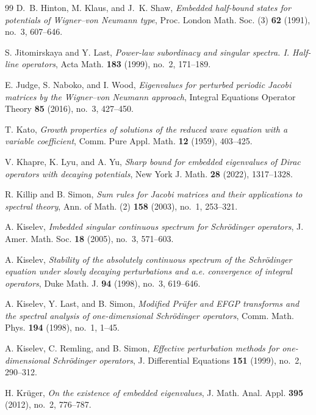 \documentclass[12pt]{amsart}
\theoremstyle{plain}
\theoremstyle{definition}
\begin{document}
\begin{thebibliography}{99}
	D.~B. Hinton, M. Klaus, and J.~K. Shaw,
	\emph{Embedded half-bound states for potentials of Wigner--von Neumann
		type},
	Proc. London Math. Soc. (3) \textbf{62} (1991), no.~3, 607--646.
	
	
	
	S. Jitomirskaya and Y. Last,
	\emph{Power-law subordinacy and singular spectra. I. Half-line
		operators},
	Acta Math. \textbf{183} (1999), no.~2, 171--189.
	
	
	E. Judge, S. Naboko, and I. Wood,
	\emph{Eigenvalues for perturbed periodic Jacobi matrices by the
		Wigner--von Neumann approach},
	Integral Equations Operator Theory \textbf{85} (2016), no.~3, 427--450.
	
	T. Kato,
	\emph{Growth properties of solutions of the reduced wave equation
		with a variable coefficient},
	Comm. Pure Appl. Math. \textbf{12} (1959), 403--425.
	
	V. Khapre, K. Lyu, and A. Yu,
	\emph{Sharp bound for embedded eigenvalues of Dirac operators with
		decaying potentials},
	New York J. Math. \textbf{28} (2022), 1317--1328.
	
	R. Killip and B. Simon,
	\emph{Sum rules for Jacobi matrices and their applications to spectral
		theory},
	Ann. of Math. (2) \textbf{158} (2003), no.~1, 253--321.
	
	A. Kiselev,
	\emph{Imbedded singular continuous spectrum for Schr\"odinger
		operators},
	J. Amer. Math. Soc. \textbf{18} (2005), no.~3, 571--603.
	
	A. Kiselev,
	\emph{Stability of the absolutely continuous spectrum of the
		Schr\"odinger equation under slowly decaying perturbations and a.e.
		convergence of integral operators},
	Duke Math. J. \textbf{94} (1998), no.~3, 619--646.
	
	A. Kiselev, Y. Last, and B. Simon,
	\emph{Modified Pr\"ufer and EFGP transforms and the spectral analysis
		of one-dimensional Schr\"odinger operators},
	Comm. Math. Phys. \textbf{194} (1998), no.~1, 1--45.
	
	A. Kiselev, C. Remling, and B. Simon,
	\emph{Effective perturbation methods for one-dimensional
		Schr\"odinger operators},
	J. Differential Equations \textbf{151} (1999), no.~2, 290--312.
	
	H. Kr\"uger,
	\emph{On the existence of embedded eigenvalues},
	J. Math. Anal. Appl. \textbf{395} (2012), no.~2, 776--787.
	

\end{thebibliography}
\end{document}
